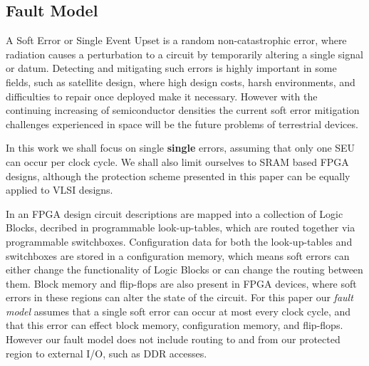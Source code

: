 \subsection{Fault Model}
A Soft Error or Single Event Upset is a random non-catastrophic error, where radiation causes
a perturbation to a circuit by temporarily altering a single signal or datum. 
Detecting and mitigating such errors is highly important in some fields, such as satellite design, 
where high design costs, harsh environments, and difficulties to repair once deployed make it necessary. 
However with the continuing increasing of semiconductor densities the current soft error mitigation
challenges experienced in space will be the future problems of terrestrial devices\cite{normand1996single}\cite{henkel2013reliable}.

In this work we shall focus on single \textbf{single} errors, assuming that only one SEU
can occur per clock cycle.
We shall also limit ourselves to SRAM based FPGA designs, although the protection scheme 
presented in this paper can be equally applied to VLSI designs.

In an FPGA design circuit descriptions are mapped into a collection of Logic Blocks, decribed in programmable look-up-tables,
which are routed together via programmable switchboxes.
Configuration data for both the look-up-tables and switchboxes are stored in a configuration memory, which means soft errors
can either change the functionality of Logic Blocks or can change the routing between them.
Block memory and flip-flops are also present in FPGA devices, where soft errors in these regions can alter the state of the circuit.
For this paper our \emph{fault model} assumes that a single soft error can occur at most every clock cycle, and that this error can effect block memory, configuration memory, and flip-flops. 
However our fault model does not include routing to and from our protected region to external I/O, such as DDR accesses.


